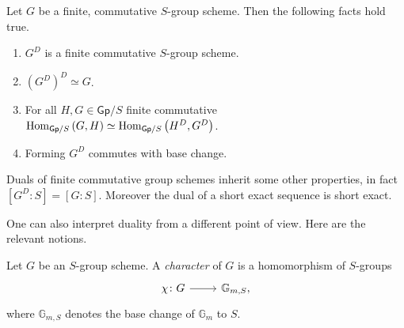\begin{thm}\label{thm:CartierDuality}
	Let $G$ be a finite, commutative $S$-group scheme.
	Then the following facts hold true.
\begin{enumerate}
	\item $G^D$ is a finite commutative $S$-group scheme.
	\item $( G^D )^D \simeq G$.
	\item For all $H,G \in \mathsf{Gp}/S$ finite commutative 
	$\operatorname{Hom}_{\mathsf{Gp}/S} \left( G, H \right) \simeq
	\operatorname{Hom}_{\mathsf{Gp}/S} \left( H^D, G^D \right)$.
	\item Forming $G^D$ commutes with base change.
\end{enumerate}
\end{thm}


\begin{rem}[]\label{rem:DualityOtherProperties}
	Duals of finite commutative group schemes inherit some other properties,
	in fact $[G^D : S] = [G : S]$.
	Moreover the dual of a short exact sequence is short exact.
\end{rem}


\noindent
One can also interpret duality from a different point of view.
Here are the relevant notions.
\begin{defn}
	Let $G$ be an $S$-group scheme.
	A \emph{character} of $G$ is a homomorphism of $S$-groups
	\begin{equation*}
	\begin{tikzcd}[row sep = 0ex
		,/tikz/column 1/.append style={anchor=base east}
		,/tikz/column 2/.append style={anchor=base west}]
		\chi\colon G \arrow[r, "", rightarrow] &
		\mathbb{G}_{ m,S }
	,\end{tikzcd}
	\end{equation*} 
	where \(\mathbb{G}_{ m,S }\) denotes the base change of
	\(\mathbb{G}_{ m }\) to \(S\).
\end{defn}


